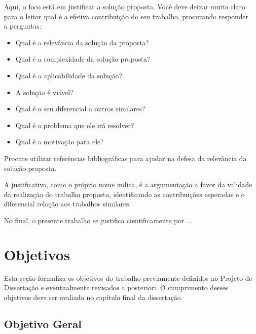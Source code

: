 Aqui, o foco está em justificar a solução proposta. Você deve deixar muito claro para o leitor qual é a efetiva contribuição do seu trabalho, procurando responder a perguntas:

\begin{itemize}
    \item Qual é a relevância da solução da proposta?
    
    \item Qual é a complexidade da solução proposta?
    
    \item Qual é a aplicabilidade da solução?
    
    \item A solução é viável?
    
    \item Qual é o seu diferencial a outros similares?
    
    \item Qual é o problema que ele irá resolver?
    
    \item Qual é a motivação para ele?
\end{itemize}

Procure utilizar referências bibliográficas para ajudar na defesa da relevância da solução proposta.

A justificativa, como o próprio nome indica, é a argumentação a favor da validade da realização do trabalho proposto, identificando as contribuições esperadas e o diferencial relação aos trabalhos similares.

No final, o presente trabalho se justifica cientificamente por ...



\section{Objetivos}
\label{s_cintro_objetivos}

Esta seção formaliza os objetivos do trabalho previamente definidos no Projeto de Dissertação e eventualmente revisados a posteriori. O cumprimento desses objetivos deve ser avaliado no capítulo final da dissertação.


\subsection{Objetivo Geral}
\label{ss_cintro_objetivo_geral}

